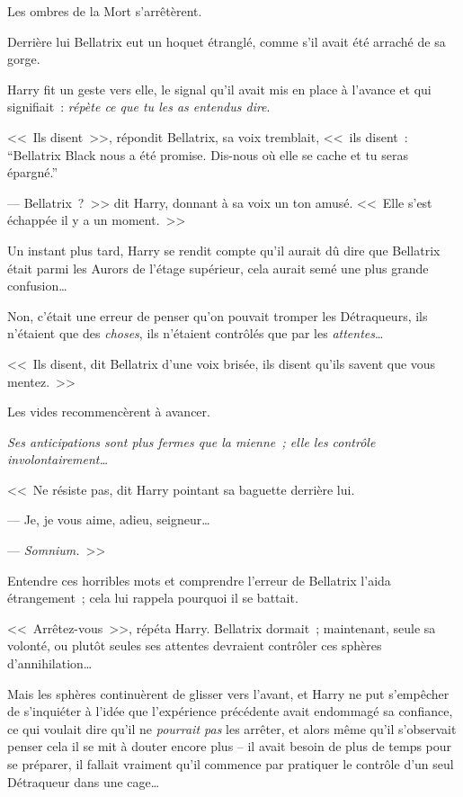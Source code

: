 Les ombres de la Mort s'arrêtèrent.

Derrière lui Bellatrix eut un hoquet étranglé, comme s'il avait été arraché de sa gorge.

Harry fit un geste vers elle, le signal qu'il avait mis en place à l'avance et qui signifiait~: \emph{répète ce que tu les as entendus dire}.

<<~Ils disent~>>, répondit Bellatrix, sa voix tremblait, <<~ils disent~: “Bellatrix Black nous a été promise. Dis-nous où elle se cache et tu seras épargné.”

--- Bellatrix~?~>> dit Harry, donnant à sa voix un ton amusé. <<~Elle s'est échappée il y a un moment.~>>

Un instant plus tard, Harry se rendit compte qu'il aurait dû dire que Bellatrix était parmi les Aurors de l'étage supérieur, cela aurait semé une plus grande confusion…

Non, c'était une erreur de penser qu'on pouvait tromper les Détraqueurs, ils n'étaient que des \emph{choses}, ils n'étaient contrôlés que par les \emph{attentes}…

<<~Ils disent, dit Bellatrix d'une voix brisée, ils disent qu'ils savent que vous mentez.~>>

Les vides recommencèrent à avancer.

\emph{Ses anticipations sont plus fermes que la mienne~; elle les contrôle involontairement…}

<<~Ne résiste pas, dit Harry pointant sa baguette derrière lui.

--- Je, je vous aime, adieu, seigneur…

--- \emph{Somnium.}~>>

Entendre ces horribles mots et comprendre l'erreur de Bellatrix l'aida étrangement~; cela lui rappela pourquoi il se battait.

<<~Arrêtez-vous~>>, répéta Harry. Bellatrix dormait~; maintenant, seule sa volonté, ou plutôt seules ses attentes devraient contrôler ces sphères d'annihilation…

Mais les sphères continuèrent de glisser vers l'avant, et Harry ne put s'empêcher de s'inquiéter à l'idée que l'expérience précédente avait endommagé sa confiance, ce qui voulait dire qu'il ne \emph{pourrait pas} les arrêter, et alors même qu'il s'observait penser cela il se mit à douter encore plus -- il avait besoin de plus de temps pour se préparer, il fallait vraiment qu'il commence par pratiquer le contrôle d'un seul Détraqueur dans une cage…

